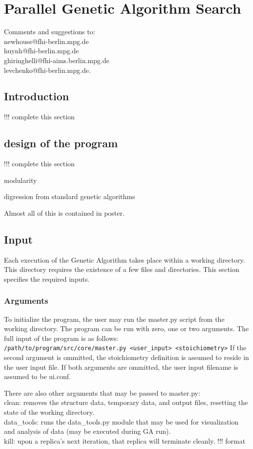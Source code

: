 
\chapter[Genetic Algorithm]{Parallel Genetic Algorithm Search}
\label{appendix_genetic_algorithm}

Comments and suggestions to: \\newhouse@fhi-berlin.mpg.de \\huynh@fhi-berlin.mpg.de \\ghiringhelli@fhi-aims.berlin.mpg.de \\levchenko@fhi-berlin.mpg.de.

\section{Introduction}
!!! complete this section


\section{design of the program}
!!! complete this section

	modularity
	
	digression from standard genetic algorithms
	
	Almost all of this is contained in poster.

\section{Input}
	Each execution of the Genetic Algorithm takes place within a working directory. This directory requires the existence of a few files and directories. This section specifies the required inputs. 

\subsection{Arguments}
	To initialize the program, the user may run the master.py script from the working directory. The program can be run with zero, one or two arguments. The full input of the program is as follows: \\
\texttt{/path/to/program/src/core/master.py <user\_input> <stoichiometry>}
	If the second argument is ommitted, the stoichiometry definition is assumed to reside in the user input file. If both arguments are ommitted, the user input filename is assumed to be ui.conf.
	
	There are also other arguments that may be passed to master.py:\\
	clean: removes the structure data, temporary data, and output files, resetting the state of the working directory.\\
	data\_tools: runs the data\_tools.py module that may be used for visualization and analysis of data (may be executed during GA run).\\
	kill: upon a replica's next iteration, that replica will terminate cleanly. !!! format

